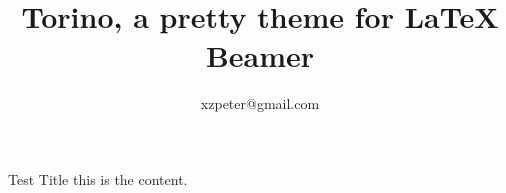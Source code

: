 \author{xzpeter@gmail.com}
\title{Torino, a pretty theme for \LaTeX{} Beamer}

\begin{frame}
	\titlepage
\end{frame}

\begin{frame}[t]{Test Title}
	this is the content.
\end{frame}
